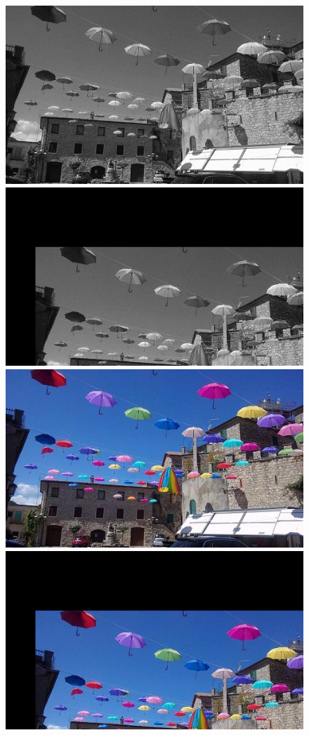 \documentclass{article}
\begin{document}
	\begin{figure}[!ht]	
	\centering	
	\includegraphics{img/gray-obraz1}	
	\includegraphics{img/geometryczne/przemieszczanie-gray}
	\includegraphics{img/rgb-obraz1}	
	\includegraphics{img/geometryczne/przemieszczanie-rgb}

\end{figure}
\end{document}
